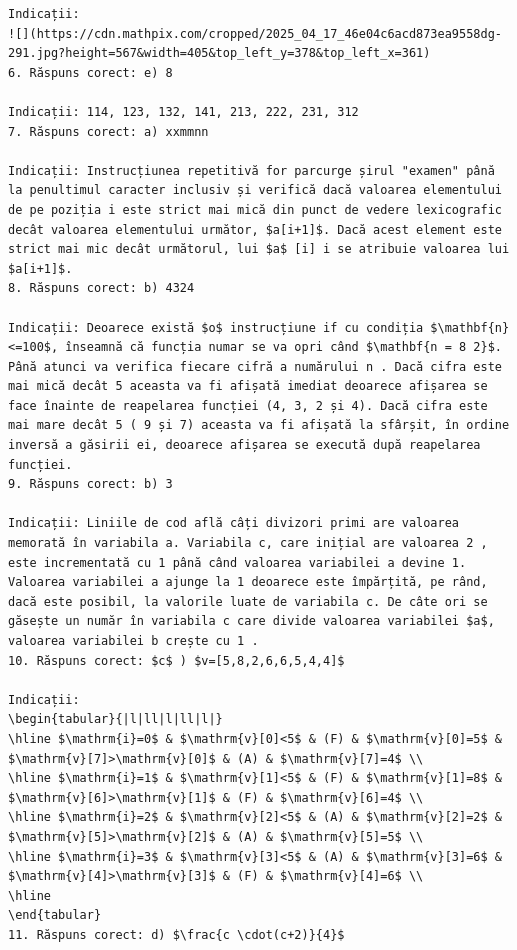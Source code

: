 \documentclass[10pt]{article}
\begin{document}
\begin{verbatim}
Indicații:
![](https://cdn.mathpix.com/cropped/2025_04_17_46e04c6acd873ea9558dg-291.jpg?height=567&width=405&top_left_y=378&top_left_x=361)
6. Răspuns corect: e) 8

Indicații: 114, 123, 132, 141, 213, 222, 231, 312
7. Răspuns corect: a) xxmmnn

Indicații: Instrucțiunea repetitivă for parcurge șirul "examen" până la penultimul caracter inclusiv și verifică dacă valoarea elementului de pe poziția i este strict mai mică din punct de vedere lexicografic decât valoarea elementului următor, $a[i+1]$. Dacă acest element este strict mai mic decât următorul, lui $a$ [i] i se atribuie valoarea lui $a[i+1]$.
8. Răspuns corect: b) 4324

Indicații: Deoarece există $o$ instrucțiune if cu condiția $\mathbf{n}<=100$, înseamnă că funcția numar se va opri când $\mathbf{n = 8 2}$. Până atunci va verifica fiecare cifră a numărului n . Dacă cifra este mai mică decât 5 aceasta va fi afișată imediat deoarece afișarea se face înainte de reapelarea funcției (4, 3, 2 și 4). Dacă cifra este mai mare decât 5 ( 9 și 7) aceasta va fi afișată la sfârșit, în ordine inversă a găsirii ei, deoarece afișarea se execută după reapelarea funcției.
9. Răspuns corect: b) 3

Indicații: Liniile de cod află câți divizori primi are valoarea memorată în variabila a. Variabila c, care inițial are valoarea 2 , este incrementată cu 1 până când valoarea variabilei a devine 1. Valoarea variabilei a ajunge la 1 deoarece este împărțită, pe rând, dacă este posibil, la valorile luate de variabila c. De câte ori se găsește un număr în variabila c care divide valoarea variabilei $a$, valoarea variabilei b crește cu 1 .
10. Răspuns corect: $c$ ) $v=[5,8,2,6,6,5,4,4]$

Indicații:
\begin{tabular}{|l|ll|l|ll|l|}
\hline $\mathrm{i}=0$ & $\mathrm{v}[0]<5$ & (F) & $\mathrm{v}[0]=5$ & $\mathrm{v}[7]>\mathrm{v}[0]$ & (A) & $\mathrm{v}[7]=4$ \\
\hline $\mathrm{i}=1$ & $\mathrm{v}[1]<5$ & (F) & $\mathrm{v}[1]=8$ & $\mathrm{v}[6]>\mathrm{v}[1]$ & (F) & $\mathrm{v}[6]=4$ \\
\hline $\mathrm{i}=2$ & $\mathrm{v}[2]<5$ & (A) & $\mathrm{v}[2]=2$ & $\mathrm{v}[5]>\mathrm{v}[2]$ & (A) & $\mathrm{v}[5]=5$ \\
\hline $\mathrm{i}=3$ & $\mathrm{v}[3]<5$ & (A) & $\mathrm{v}[3]=6$ & $\mathrm{v}[4]>\mathrm{v}[3]$ & (F) & $\mathrm{v}[4]=6$ \\
\hline
\end{tabular}
11. Răspuns corect: d) $\frac{c \cdot(c+2)}{4}$


\end{verbatim}
\end{document}
